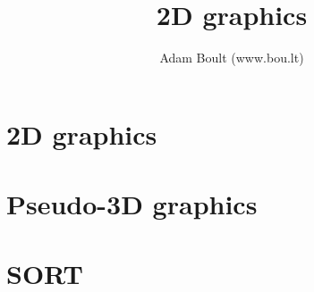 \documentclass[oneside]{book}
\begin{document}
\author{Adam Boult (www.bou.lt)}
\title{2D graphics}
\maketitle

\setcounter{tocdepth}{0}
\tableofcontents



\part{2D graphics}





\part{Pseudo-3D graphics}



\part{SORT}

\end{document}
